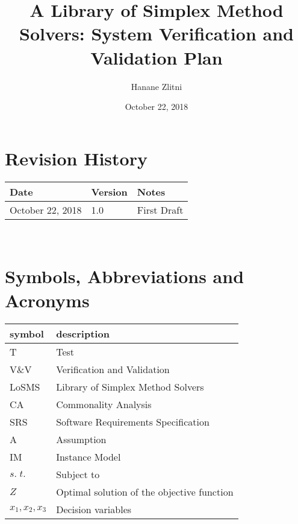 \documentclass[12pt, titlepage]{article}
\newcommand{\famname}{LoSMS} %
\begin{document}
\title{A Library of Simplex Method Solvers: System Verification and Validation 
Plan} 
\author{Hanane Zlitni}
\date{October 22, 2018}
	
\maketitle


\section{Revision History}

\begin{tabularx}{\textwidth}{p{3cm}p{2cm}X}
\toprule {\bf Date} & {\bf Version} & {\bf Notes}\\
\midrule
October 22, 2018 & 1.0 & First Draft\\
\bottomrule
\end{tabularx}

~\newpage

\section{Symbols, Abbreviations and Acronyms}

\renewcommand{\arraystretch}{1.2}
\begin{tabular}{l l} 
  \toprule		
  \textbf{symbol} & \textbf{description}\\
  \midrule 
  T & Test\\
  V\&V & Verification and Validation\\
  \famname{} & Library of Simplex Method Solvers\\
  CA & Commonality Analysis\\
  SRS & Software Requirements Specification\\
  A & Assumption\\
  IM & Instance Model\\
  $s.\;t.$ & Subject to\\
  $Z$ & Optimal solution of the objective function\\
  $x_1, x_2, x_3$ & Decision variables\\
  \bottomrule
\end{tabular}\\

\newpage

\tableofcontents

\listoftables
\end{document}
